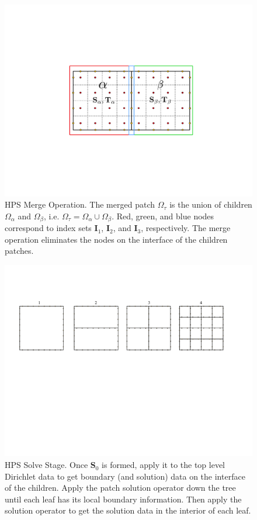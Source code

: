 \begin{figure}
    \centering
    \includegraphics[width=0.7\columnwidth]{figures/merge_figure.pdf}
    \caption{HPS Merge Operation. The merged patch $\Omega_{\tau}$ is the union of children $\Omega_{\alpha}$ and $\Omega_{\beta}$, i.e. $\Omega_{\tau} = \Omega_{\alpha} \cup \Omega_{\beta}$. Red, green, and blue nodes correspond to index sets $\textbf{I}_1$, $\textbf{I}_2$, and $\textbf{I}_3$, respectively. The merge operation eliminates the nodes on the interface of the children patches.}
    \label{fig:merge}
\end{figure}

\begin{figure}
    \centering
    \includegraphics[width=\columnwidth]{figures/solve_figure.pdf}
    \caption{HPS Solve Stage. Once $\textbf{S}_0$ is formed, apply it to the top level Dirichlet data to get boundary (and solution) data on the interface of the children. Apply the patch solution operator down the tree until each leaf has its local boundary information. Then apply the solution operator to get the solution data in the interior of each leaf.}
    \label{fig:solve}
\end{figure}


